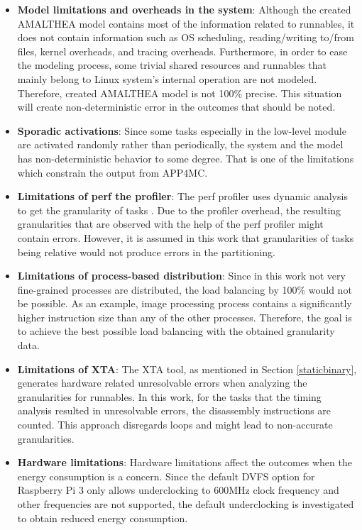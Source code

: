 \begin{itemize}
	\item \textbf{Model limitations and overheads in the system}: Although the created AMALTHEA model contains most of the information related to runnables, it does not contain information such as OS scheduling, reading/writing to/from files, kernel overheads, and tracing overheads. Furthermore, in order to ease the modeling process, some trivial shared resources and runnables that mainly belong to Linux system's internal operation are not modeled. Therefore, created AMALTHEA model is not 100\% precise. This situation will create non-deterministic error in the outcomes that should be noted. 
	\item \textbf{Sporadic activations}: Since some tasks especially in the low-level module are activated randomly rather than periodically, the system and the model has non-deterministic behavior to some degree. That is one of the limitations which constrain the output from APP4MC. %
	\item \textbf{Limitations of perf the profiler}: The perf profiler uses dynamic analysis to get the granularity of tasks \cite{perf2}. Due to the profiler overhead, the resulting granularities that are observed with the help of the perf profiler might contain errors. However, it is assumed in this work that granularities of tasks being relative would not produce errors in the partitioning.
	\item \textbf{Limitations of process-based distribution}: Since in this work not very fine-grained processes are distributed, the load balancing by 100\% would not be possible. As an example, image processing process contains a significantly higher instruction size than any of the other processes. Therefore, the goal is to achieve the best possible load balancing with the obtained granularity data. %
	\item \textbf{Limitations of XTA}: The XTA tool, as mentioned in Section \ref{staticbinary}, generates hardware related unresolvable errors when analyzing the granularities for runnables. In this work, for the tasks that the timing analysis resulted in unresolvable errors, the disassembly instructions are counted. This approach disregards loops and might lead to non-accurate granularities.
	\item \textbf{Hardware limitations}: Hardware limitations affect the outcomes when the energy consumption is a concern. Since the default DVFS option for Raspberry Pi 3 only allows underclocking to 600MHz clock frequency and other frequencies are not supported, the default underclocking is investigated to obtain reduced energy consumption.%

\end{itemize}

